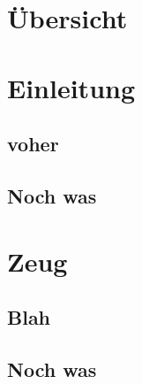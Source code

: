 \documentclass{beamer}
\begin{document}
\section*{Übersicht}
\begin{frame}
  \tableofcontents
\end{frame}

\section{Einleitung}
\frame{}
\subsection{voher}
\frame{}
\subsection{Noch was}
\frame{}

\section{Zeug}
\frame{}
\subsection{Blah}
\frame{}
\subsection{Noch was}
\frame{}
\end{document}
